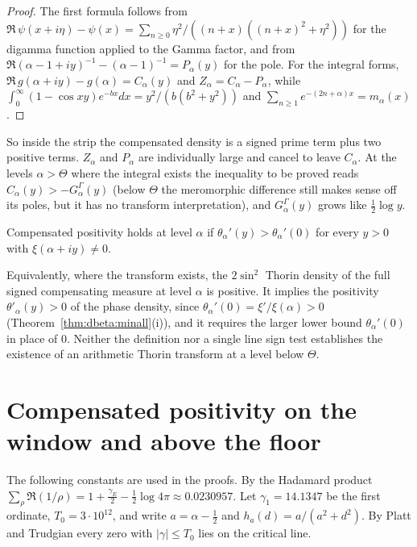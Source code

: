 \begin{proof}
The first formula follows from $\Re\,\psi(x+i\eta)-\psi(x)=\sum_{n\ge0}\eta^2/((n+x)((n+x)^2+\eta^2))$ for the digamma function applied to the Gamma factor, and from $\Re(\alpha-1+iy)^{-1}-(\alpha-1)^{-1}=P_\alpha(y)$ for the pole. For the integral forms, $\Re\,g(\alpha+iy)-g(\alpha)=C_\alpha(y)$ and $Z_\alpha=C_\alpha-P_\alpha$, while $\int_0^\infty(1-\cos xy)e^{-bx}dx=y^2/(b(b^2+y^2))$ and $\sum_{n\ge1}e^{-(2n+\alpha)x}=m_\alpha(x)$.
\end{proof}

So inside the strip the compensated density is a signed prime term plus two positive terms. $Z_\alpha$ and $P_\alpha$ are individually large and cancel to leave $C_\alpha$. At the levels $\alpha>\Theta$ where the integral exists the inequality to be proved reads $C_\alpha(y)>-G^\Gamma_\alpha(y)$ (below $\Theta$ the meromorphic difference still makes sense off its poles, but it has no transform interpretation), and $G^\Gamma_\alpha(y)$ grows like $\tfrac12\log y$.

\begin{definition}\label{qt:def:comp}
Compensated positivity holds at level $\alpha$ if $\theta_\alpha'(y)>\theta_\alpha'(0)$ for every $y>0$ with $\xi(\alpha+iy)\ne0$.
\end{definition}

Equivalently, where the transform exists, the $2\sin^2$ Thorin density of the full signed compensating measure at level $\alpha$ is positive. It implies the positivity $\theta'_\alpha(y)>0$ of the phase density, since $\theta_\alpha'(0)=\xi'/\xi(\alpha)>0$ (Theorem~\ref{thm:dbeta:minall}(i)), and it requires the larger lower bound $\theta_\alpha'(0)$ in place of $0$. Neither the definition nor a single line sign test establishes the existence of an arithmetic Thorin transform at a level below $\Theta$.

\section{Compensated positivity on the window and above the floor}\label{qt:sec:compwindow}

The following constants are used in the proofs. By the Hadamard product $\sum_\rho\Re(1/\rho)=1+\tfrac{\gamma_E}2-\tfrac12\log4\pi\approx0.0230957$. Let $\gamma_1=14.1347$ be the first ordinate, $T_0=3\cdot10^{12}$, and write $a=\alpha-\tfrac12$ and $h_a(d)=a/(a^2+d^2)$. By Platt and Trudgian \cite{PT21} every zero with $|\gamma|\le T_0$ lies on the critical line.


